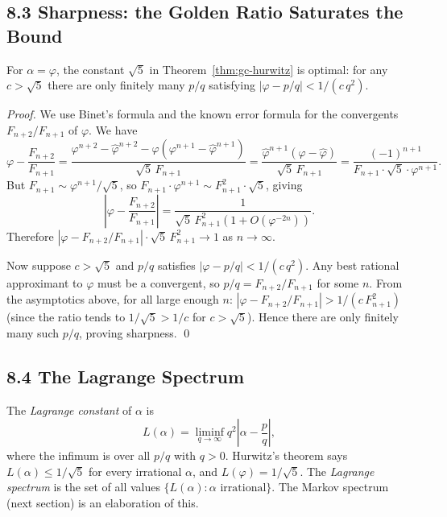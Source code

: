 \subsection{8.3 Sharpness: the Golden Ratio Saturates the Bound}
\label{subsec:gc-hurwitz-sharp}

\begin{theorem}
\label{thm:gc-hurwitz-sharp}
For $\alpha = \varphi$, the constant $\sqrt{5}$ in
Theorem~\ref{thm:gc-hurwitz} is optimal: for any
$c > \sqrt{5}$ there are only finitely many $p/q$
satisfying $|\varphi - p/q| < 1/(c\,q^2)$.
\end{theorem}

\begin{proof}
We use Binet's formula and the known error formula
for the convergents $F_{n+2}/F_{n+1}$ of $\varphi$.
We have
\[
  \varphi - \frac{F_{n+2}}{F_{n+1}}
  = \frac{\varphi^{n+2} - \hat\varphi^{n+2}
          - \varphi(\varphi^{n+1}-\hat\varphi^{n+1})}
    {\sqrt{5}\,F_{n+1}}
  = \frac{\hat\varphi^{n+1}(\varphi - \hat\varphi)}
    {\sqrt{5}\,F_{n+1}}
  = \frac{(-1)^{n+1}}{F_{n+1} \cdot \sqrt{5} \cdot \varphi^{n+1}}.
\]
But $F_{n+1} \sim \varphi^{n+1}/\sqrt{5}$, so
$F_{n+1} \cdot \varphi^{n+1} \sim F_{n+1}^2 \cdot \sqrt{5}$,
giving
\[
  \left|\varphi - \frac{F_{n+2}}{F_{n+1}}\right|
  = \frac{1}{\sqrt{5}\,F_{n+1}^2(1 + O(\varphi^{-2n}))}.
\]
Therefore
$\left|\varphi - F_{n+2}/F_{n+1}\right| \cdot \sqrt{5}\,F_{n+1}^2 \to 1$
as $n \to \infty$.

Now suppose $c > \sqrt{5}$ and $p/q$ satisfies
$|\varphi - p/q| < 1/(c\,q^2)$.
Any best rational approximant to $\varphi$ must be a
convergent, so $p/q = F_{n+2}/F_{n+1}$ for some $n$.
From the asymptotics above, for all large enough $n$:
$|\varphi - F_{n+2}/F_{n+1}| > 1/(c\,F_{n+1}^2)$
(since the ratio tends to $1/\sqrt{5} > 1/c$ for
$c > \sqrt{5}$).
Hence there are only finitely many such $p/q$,
proving sharpness.
\qed
\end{proof}

\subsection{8.4 The Lagrange Spectrum}
\label{subsec:gc-lagrange}

The \emph{Lagrange constant} of $\alpha$ is
\[
  L(\alpha) = \liminf_{q\to\infty} q^2 \left|\alpha - \frac{p}{q}\right|,
\]
where the infimum is over all $p/q$ with $q>0$.
Hurwitz's theorem says $L(\alpha) \leq 1/\sqrt{5}$ for
every irrational $\alpha$, and
$L(\varphi) = 1/\sqrt{5}$.
The \emph{Lagrange spectrum} is the set of all values
$\{L(\alpha) : \alpha \text{ irrational}\}$.
The Markov spectrum (next section) is an elaboration of this.

